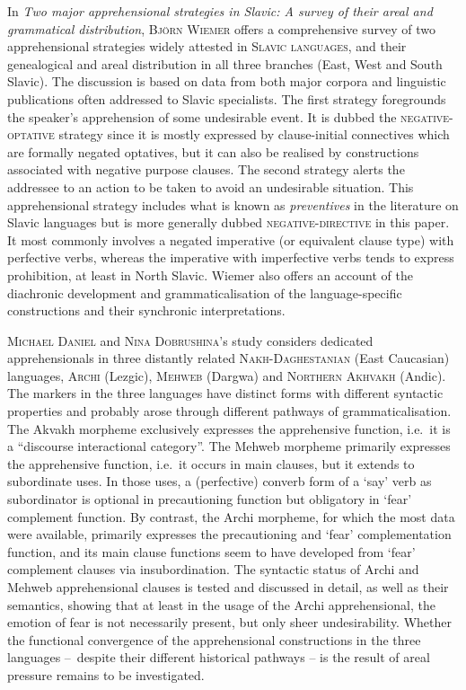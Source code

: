 \documentclass[output=paper,colorlinks,citecolor=brown
]{langscibook}
\begin{document}
In \textit{Two major apprehensional strategies in Slavic: A survey of their areal and grammatical distribution}, \textsc{Björn} \textsc{Wiemer} offers a comprehensive survey of two apprehensional strategies widely attested in \textsc{Slavic} \textsc{languages}, and their genealogical and areal distribution in all three branches (East, West and South Slavic). The discussion is based on data from both major corpora and linguistic publications often addressed to Slavic specialists. The first strategy foregrounds the speaker's apprehension of some undesirable event. It is dubbed the \textsc{negative-optative} strategy since it is mostly expressed by clause-initial connectives which are formally negated optatives, but it can also be realised by constructions associated with negative purpose clauses. The second strategy alerts the addressee to an action to be taken to avoid an undesirable situation. This apprehensional strategy includes what is known as \textit{preventives} in the literature on Slavic languages but is more generally dubbed \textsc{negative-directive} in this paper. It most commonly involves a negated imperative (or equivalent clause type) with perfective verbs, whereas the imperative with imperfective verbs tends to express prohibition, at least in North Slavic. Wiemer also offers an account of the diachronic development and grammaticalisation of the language-specific constructions and their synchronic interpretations.



\textsc{Michael} \textsc{Daniel} and \textsc{Nina} \textsc{Dobrushina}'s study considers dedicated apprehensionals in three distantly related \textsc{Nakh-Daghestanian} (East Caucasian) languages, \textsc{Archi} (Lezgic), \textsc{Mehweb} (Dargwa) and \textsc{Northern} \textsc{Akhvakh} (Andic). The markers in the three languages have distinct forms with different syntactic properties and probably arose through different pathways of grammaticalisation. The Akvakh morpheme exclusively expresses the apprehensive function, i.e.\ it is a ``discourse interactional category''. The Mehweb morpheme primarily expresses the apprehensive function, i.e.\ it occurs in main clauses, but it extends to subordinate uses. In those uses, a (perfective) converb form of a `say' verb as subordinator is optional in precautioning function but obligatory in `fear' complement function. By contrast, the Archi morpheme, for which the most data were available, primarily expresses the precautioning and `fear' complementation function, and its main clause functions seem to have developed from `fear' complement clauses via insubordination. The syntactic status of Archi and Mehweb apprehensional clauses is tested and discussed in detail, as well as their semantics, showing that at least in the usage of the Archi apprehensional, the emotion of fear is not necessarily present, but only sheer undesirability. Whether the functional convergence of the apprehensional constructions in the three languages –~despite their different historical pathways – is the result of areal pressure remains to be investigated.
\end{document}
